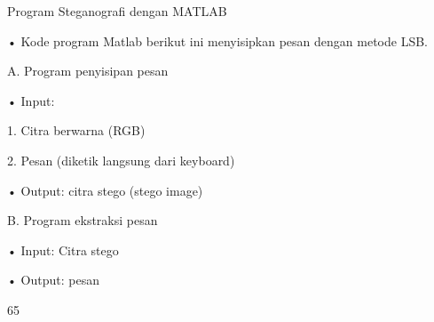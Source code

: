 \documentclass{article}
\begin{document}

Program Steganografi dengan MATLAB

• Kode program Matlab berikut ini menyisipkan pesan dengan metode LSB.

A. Program penyisipan pesan 

• Input: 

   1.  Citra berwarna (RGB)

   2.  Pesan (diketik langsung dari keyboard)

• Output: citra stego (stego image)

B. Program ekstraksi pesan

• Input:  Citra stego

• Output: pesan 

65
\end{document}
